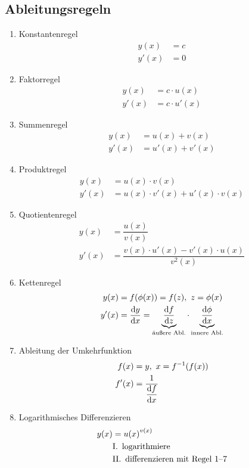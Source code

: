 \subsection{Ableitungsregeln}

\begin{enumerate}
    \item Konstantenregel
        \begin{align*}
			y(x) &= c \\
			y'(x) &= 0
        \end{align*}
    \item Faktorregel
        \begin{align*}
			y(x) &= c \cdot u(x) \\
			y'(x) &= c \cdot u'(x)
        \end{align*}
    \item Summenregel
    	\begin{align*}
			y(x) &= u(x) + v(x) \\
			y'(x) &= u'(x) + v'(x)
		\end{align*}
    \item Produktregel
		\begin{align*}
            y(x) &= u(x) \cdot v(x) \\
            y'(x) &= u(x) \cdot v'(x) + u'(x) \cdot v(x)
        \end{align*}
    \item Quotientenregel
        \begin{align*}
            y(x) &= \dfrac{u(x)}{v(x)} \\
            y'(x) &= \dfrac{v(x) \cdot u'(x) - v'(x) \cdot u(x)}{v^2(x)}
        \end{align*}
    \item Kettenregel
        \begin{align*}
            y(x) &= f(\phi(x)) = f(z),\ z = \phi(x) \\
            y'(x) &= \dfrac{\mathop{}\!\mathrm{d} y}{\mathop{}\!\mathrm{d} x} = \underbrace{\dfrac{\mathop{}\!\mathrm{d} f}{\mathop{}\!\mathrm{d} z}}_{\text{äußere Abl.}} \cdot \underbrace{\dfrac{\mathop{}\!\mathrm{d} \phi}{\mathop{}\!\mathrm{d} x}}_{\text{innere Abl.}}
        \end{align*}
    \item Ableitung der Umkehrfunktion
        \begin{align*}
            f(x) &= y,\ x = f^{-1}(f(x)) \\
            f'(x) &= \dfrac{1}{\dfrac{\mathop{}\!\mathrm{d} f}{\mathop{}\!\mathrm{d} x}}
        \end{align*}
    \item Logarithmisches Differenzieren
        \begin{align*}
            y(x) &= u{(x)}^{v(x)} \\
            &\text{I.\, logarithmiere} \\
            &\text{II.\, differenzieren mit Regel 1--7}
        \end{align*}
\end{enumerate}
